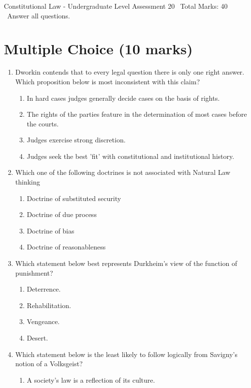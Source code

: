 \documentclass[12pt]{article}
\begin{document}
\begin{center}
Constitutional Law - Undergraduate Level Assessment 20 \
Total Marks: 40 \
Answer all questions.
\end{center}

\section*{Multiple Choice (10 marks)}
\begin{enumerate}[label=\arabic*.]
\item Dworkin contends that to every legal question there is only one right answer. Which proposition below is most inconsistent with this claim?
\begin{enumerate}[label=(\alph*)]
    \item In hard cases judges generally decide cases on the basis of rights.
    \item The rights of the parties feature in the determination of most cases before the courts.
    \item Judges exercise strong discretion.
    \item Judges seek the best 'fit' with constitutional and institutional history.
\end{enumerate}
\item Which one of the following doctrines is not associated with Natural Law thinking
\begin{enumerate}[label=(\alph*)]
    \item Doctrine of substituted security
    \item Doctrine of due process
    \item Doctrine of bias
    \item Doctrine of reasonableness
\end{enumerate}
\item Which statement below best represents Durkheim's view of the function of punishment?
\begin{enumerate}[label=(\alph*)]
    \item Deterrence.
    \item Rehabilitation.
    \item Vengeance.
    \item Desert.
\end{enumerate}
\item Which statement below is the least likely to follow logically from Savigny's notion of a Volksgeist?
\begin{enumerate}[label=(\alph*)]
    \item A society's law is a reflection of its culture.

\end{enumerate}
\end{enumerate}
\end{document}
